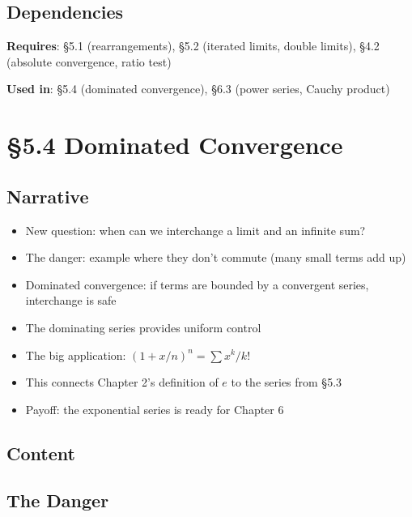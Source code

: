 \documentclass[
  10pt,
  letterpaper,
]{scrbook}
\providecommand{\tightlist}{%
  \setlength{\itemsep}{0pt}\setlength{\parskip}{0pt}}
\begin{document}
\subsection{Dependencies}\label{dependencies-22}

\textbf{Requires}: §5.1 (rearrangements), §5.2 (iterated limits, double
limits), §4.2 (absolute convergence, ratio test)

\textbf{Used in}: §5.4 (dominated convergence), §6.3 (power series,
Cauchy product)

\section{§5.4 Dominated Convergence}\label{dominated-convergence}

\subsection{Narrative}\label{narrative-23}

\begin{itemize}
\tightlist
\item
  New question: when can we interchange a limit and an infinite sum?
\item
  The danger: example where they don't commute (many small terms add up)
\item
  Dominated convergence: if terms are bounded by a convergent series,
  interchange is safe
\item
  The dominating series provides uniform control
\item
  The big application: \((1 + x/n)^n = \sum x^k/k!\)
\item
  This connects Chapter 2's definition of \(e\) to the series from §5.3
\item
  Payoff: the exponential series is ready for Chapter 6
\end{itemize}

\subsection{Content}\label{content-23}

\subsection{The Danger}\label{the-danger}
\end{document}
